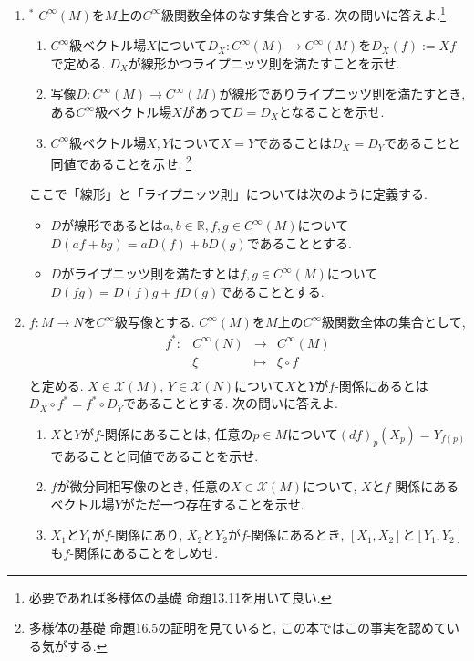 \documentclass[dvipdfmx,a4paper,11pt]{article}
\newcommand{\R}{\mathbb{R}}
\theoremstyle{definition}
\begin{document}
\begin{enumerate}[label=\textbf{問}2.\arabic*]
\item $^{*}$ $C^{\infty}(M)$を$M$上の$C^{\infty}$級関数全体のなす集合とする. 
次の問いに答えよ.\footnote{必要であれば多様体の基礎 命題13.11を用いて良い.}
\begin{enumerate}
\item $C^{\infty}$級ベクトル場$X$について$D_{X} : C^{\infty}(M)  \rightarrow  C^{\infty}(M) $を$D_{X}(f) := Xf$で定める. $D_{X}$が線形かつライプニッツ則を満たすことを示せ. 
\item 写像$D :  C^{\infty}(M)  \rightarrow  C^{\infty}(M) $が線形でありライプニッツ則を満たすとき, ある$C^{\infty}$級ベクトル場$X$があって$D = D_{X}$となることを示せ.
\item $C^{\infty}$級ベクトル場$X,Y$について$X = Y$であることは$D_{X} = D_{Y}$であることと同値であることを示せ. \footnote{多様体の基礎 命題16.5の証明を見ていると, この本ではこの事実を認めている気がする. }
\end{enumerate}
ここで「線形」と「ライプニッツ則」については次のように定義する.
\begin{itemize}
\item $D$が線形であるとは$a,b \in \R, f,g \in C^{\infty}(M)$について$D(af + bg)=aD(f) + bD(g)$であることとする.
\item $D$がライプニッツ則を満たすとは$ f,g \in C^{\infty}(M)$について$D(fg)=D(f)g + fD(g)$であることとする.
\end{itemize}





\item $f : M \rightarrow N$を$C^{\infty}$級写像とする. 
$C^{\infty}(M)$を$M$上の$C^{\infty}$級関数全体の集合として, 
$$
\begin{matrix}
f^{*} : &  C^{\infty}(N) &  \rightarrow & C^{\infty}(M) \\
	 &  \xi &  \mapsto & \xi \circ f\\
\end{matrix}
$$
と定める.  $X \in \mathscr{X}(M)$, $Y \in \mathscr{X}(N)$について$X$と$Y$が$f$-関係にあるとは
$D_{X} \circ f^{*} = f^{*} \circ D_Y$であることとする. 次の問いに答えよ.
\begin{enumerate}
\item $X$と$Y$が$f$-関係にあることは, 任意の$p \in M$について$(df)_{p}(X_{p}) = Y_{f(p)}$であることと同値であることを示せ.
\item $f$が微分同相写像のとき, 任意の$X \in \mathscr{X}(M)$について, $X$と$f$-関係にあるベクトル場$Y$がただ一つ存在することを示せ.
\item $X_1$と$Y_1$が$f$-関係にあり, $X_2$と$Y_2$が$f$-関係にあるとき, $[X_1, X_2]$と$[Y_1, Y_2]$も$f$-関係にあることをしめせ.
\end{enumerate}


\end{enumerate}
\end{document}
